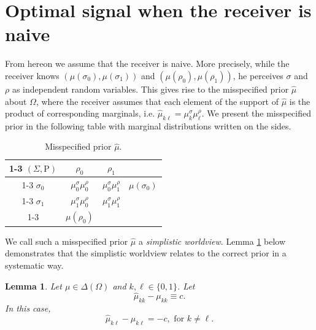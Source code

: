 \documentclass[12pt,english]{article}
\newcommand{\Rho}{\mathrm{P}}
\newtheorem{lemma}{Lemma}
\theoremstyle{plain}
\begin{document}
\section{Optimal signal when the receiver is naive}
From hereon we assume that the receiver is naive. 
More precisely, while the receiver knows $(\mu(\sigma_0),\mu(\sigma_1))$ and $(\mu(\rho_0),\mu(\rho_1))$, he perceives $\sigma$ and $\rho$ as independent random variables. 
This gives rise to the misspecified prior $\hat\mu$ about $\Omega$, where the receiver assumes that each element of the support of $\hat\mu$ is the product of corresponding marginals, i.e. $\hat\mu_{k\ell}=\mu^\sigma_k\mu^\rho_\ell$. 
We present the misspecified prior in the following table with marginal distributions written on the sides. 
\begin{table}[H]
\begin{centering}
\begin{tabular}{|c|c|c|c}
\cline{1-3} \cline{2-3} \cline{3-3} 
$(\Sigma,\Rho)$ & $\rho_0$ & $\rho_1$ & \tabularnewline
\cline{1-3} \cline{2-3} \cline{3-3} 
$\sigma_0$ & $\mu^\sigma_0\mu^\rho_0$ & $\mu^\sigma_0\mu^\rho_1$ & $\mu(\sigma_0)$\tabularnewline
\cline{1-3} \cline{2-3} \cline{3-3} 
$\sigma_1$ & $\mu^\sigma_1\mu^\rho_0$ & $\mu^\sigma_1\mu^\rho_1$ & \tabularnewline
\cline{1-3} \cline{2-3} \cline{3-3} 
\multicolumn{1}{c}{} & \multicolumn{1}{c}{$\mu(\rho_0)$} & \multicolumn{1}{c}{} & \tabularnewline
\end{tabular}
\par\end{centering}
\caption{Misspecified prior $\hat\mu$.}
\label{tab:mprior}
\end{table}

\noindent We call such a misspecified prior $\hat\mu$ a \emph{simplistic worldview}. Lemma \ref{lem:mprior} below demonstrates that  the simplistic worldview relates to the correct prior in a systematic way.

\begin{lemma}\label{lem:mprior} Let $\mu\in\Delta(\Omega)$ and
$k,\ell\in\{0,1\}$. Let \[\hat{\mu}_{kk}-\mu_{kk} \equiv c.\] In this case,
\[\hat{\mu}_{k\ell}-\mu_{k\ell}=-c, \text{ for }  k\neq\ell.\] \end{lemma}
\end{document}
